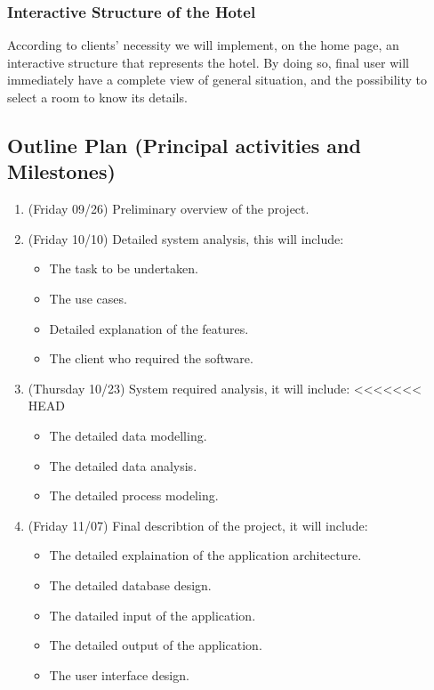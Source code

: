 \subsubsection{Interactive Structure of the Hotel}
	
According to clients’ necessity we will implement, on the home page, an interactive structure that represents the hotel. 
By doing so, final user will immediately have a complete view of general situation, and the possibility to select a room to know its details.

\subsection{Outline Plan (Principal activities and Milestones)}

\begin{enumerate}

\item (Friday 09/26) Preliminary overview of the project.

\item (Friday 10/10) Detailed system analysis, this will include:
	\begin{itemize}
		\item The task to be undertaken.
		\item The use cases.
		\item Detailed explanation of the features.
		\item The client who required the software.
	\end{itemize}

\item (Thursday 10/23) System required analysis, it will include:
<<<<<<< HEAD
  \begin{itemize}
    \item The detailed data modelling.
    \item The detailed data analysis.
    \item The detailed process modeling. 
  \end{itemize}

\item (Friday 11/07) Final describtion of the project, it will include:
  \begin{itemize}
    \item The detailed explaination of the application architecture.
    \item The detailed database design.
    \item The datailed input of the application.
    \item The detailed output of the application.
    \item The user interface design.
\end{itemize}

\end{enumerate}

